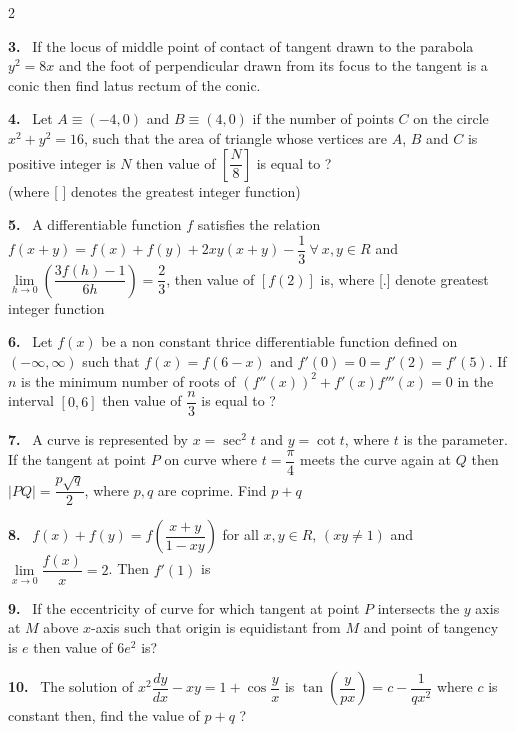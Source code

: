 \documentclass[10pt]{extarticle}
\newcommand{\qn}[1]{\par\smallskip\noindent\textbf{#1.}~}
\begin{document}
\begin{multicols}{2}
\qn{3} If the locus of middle point of contact of tangent drawn to the parabola $y^2=8x$ and the foot of perpendicular drawn from its focus to the tangent is a conic then find latus rectum of the conic.
\qn{4} Let $A\equiv(-4,0)$ and $B\equiv(4,0)$ if the number of points $C$ on the circle $x^2+y^2=16$, such that the area of triangle whose vertices are $A$, $B$ and $C$ is positive integer is $N$ then value of $\left[\dfrac N8\right]$ is equal to ?\\
(where [ ] denotes the greatest integer function)
\qn{5} A differentiable function $f$ satisfies the relation $f(x+y)=f(x)+f(y)+2xy(x+y)-\dfrac13\ \forall\ x,y\in R$ and $\lim\limits_{h\to0}\left(\dfrac{3f(h)-1}{6h}\right)=\dfrac23$, then value of $[f(2)]$ is, where [.] denote greatest integer function
\qn{6} Let $f(x)$ be a non constant thrice differentiable function defined on $(-\infty,\infty)$ such that $f(x)=f(6-x)$ and $f'(0)=0=f'(2)=f'(5)$. If $n$ is the minimum number of roots of $(f''(x))^2+f'(x)f'''(x)=0$ in the interval $[0,6]$ then value of $\dfrac n3$ is equal to ?
\qn{7} A curve is represented by $x=\sec^2t$ and $y=\cot t$, where $t$ is the parameter. If the tangent at point $P$ on curve where $t=\dfrac\pi4$ meets the curve again at $Q$ then $|PQ|=\dfrac{p\sqrt q}2$, where $p,q$ are coprime. Find $p+q$
\qn{8} $f(x)+f(y)=f\left(\dfrac{x+y}{1-xy}\right)$ for all $x,y\in R$, $(xy\ne1)$ and $\lim\limits_{x\to0}\dfrac{f(x)}x=2$. Then $f'(1)$ is
\qn{9} If the eccentricity of curve for which tangent at point $P$ intersects the $y$ axis at $M$ above $x$-axis such that origin is equidistant from $M$ and point of tangency is $e$ then value of $6e^2$ is?
\qn{10} The solution of $x^2\dfrac{dy}{dx}-xy=1+\cos\dfrac yx$ is $\tan\left(\dfrac y{px}\right)=c-\dfrac1{qx^2}$ where $c$ is constant then, find the value of $p+q$ ?

\end{multicols}
\end{document}
